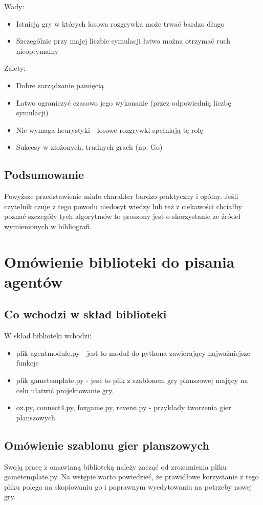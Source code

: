 \documentclass[declaration,shortabstract,inz]{iithesis}
\begin{document}
Wady:
\begin{itemize}
  \item Istnieją gry w których losowa rozgrywka może trwać bardzo długo
  \item Szczególnie przy majej liczbie symulacji łatwo można otrzymać ruch nieoptymalny
\end{itemize}

Zalety:
\begin{itemize}
  \item Dobre zarządzanie pamięcią
  \item Łatwo ograniczyć czasowo jego wykonanie (przez odpowiednią liczbę symulacji)
  \item Nie wymaga heurystyki - losowe rozgrywki spełniają tę rolę
  \item Sukcesy w złożonych, trudnych grach (np. Go)
\end{itemize}
\section{Podsumowanie}
Powyższe przedstawienie miało charakter bardzo praktyczny i ogólny.
Jeśli czytelnik czuje z tego powodu niedosyt wiedzy lub też z ciekawości chciałby poznać szczegóły tych algorytmów to proszony jest o skorzystanie ze źródeł wymienionych w bibliografi.
\chapter{Omówienie biblioteki do pisania agentów}
\section{Co wchodzi w skład biblioteki}
W skład biblioteki wchodzi:
\begin{itemize}
  \item plik agent\textunderscore module.py - jest to moduł do pythona zawierający najważniejsze funkcje
  \item plik game\textunderscore template.py - jest to plik z szablonem gry planszowej mający na celu ułatwić projektowanie gry.
  \item ox.py, connect4.py, fox\textunderscore game.py, reversi.py - przykłady tworzenia gier planszowych
\end{itemize}
\section{Omówienie szablonu gier planszowych}
Swoją pracę z omawianą biblioteką należy zacząć od zrozumienia pliku game\textunderscore template.py.
Na wstępie warto powiedzieć, że prawidłowe korzystanie z tego pliku polega na skopiowaniu go i poprawnym wyedytowaniu na potrzeby nowej gry.
\end{document}
